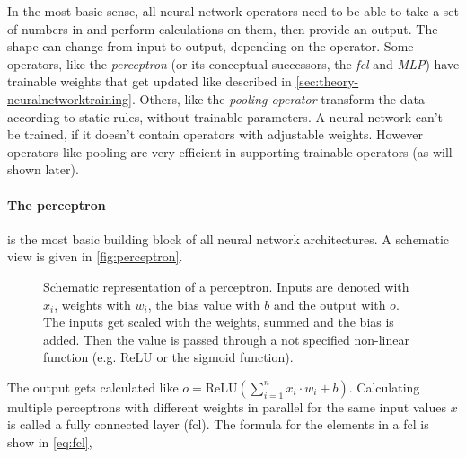 In the most basic sense, all neural network operators need to be able to take a set of numbers in and perform calculations on them, then provide an output.
The shape can change from input to output, depending on the operator.
Some operators, like the \emph{perceptron} (or its conceptual successors, the \emph{fcl} and \emph{MLP}) have trainable weights that get updated like described in \autoref{sec:theory-neuralnetworktraining}.
Others, like the \emph{pooling operator} transform the data according to static rules, without trainable parameters.
A neural network can't be trained, if it doesn't contain operators with adjustable weights.
However operators like pooling are very efficient in supporting trainable operators (as will shown later).

\paragraph{The perceptron} is the most basic building block of all neural network architectures.
A schematic view is given in \autoref{fig:perceptron}.

\begin{figure}[htbp]
    \centering
    \caption{Schematic representation of a perceptron. Inputs are denoted with $x_i$, weights with $w_i$, the bias value with $b$ and the output with $o$. 
        The inputs get scaled with the weights, summed and the bias is added.
        Then the value is passed through a not specified non-linear function (e.g. ReLU or the sigmoid function).
    }
    \label{fig:perceptron}
\end{figure}

The output gets calculated like $o = \mathrm{ReLU} \left(\sum\limits_{i=1}^{n} x_i\cdot w_i + b\right)$.
Calculating multiple perceptrons with different weights in parallel for the same input values $x$ is called a fully connected layer (fcl).
The formula for the elements in a fcl is show in \autoref{eq:fcl},

